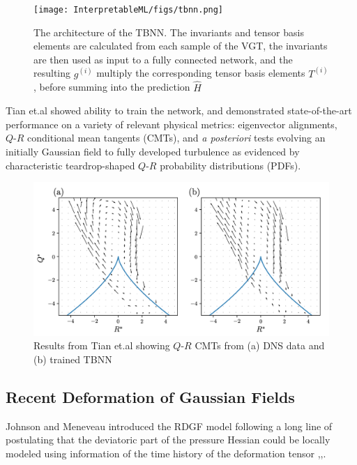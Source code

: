 \begin{figure}
    \centering
    \texttt{[image: InterpretableML/figs/tbnn.png]}
    \caption{The architecture of the TBNN. The invariants and tensor basis elements are calculated from each sample of the VGT, the invariants are then used as input to a fully connected network, and the resulting $g^{(i)}$ multiply the corresponding tensor basis elements $T^{(i)}$, before summing into the prediction $\hat{H}$}
    \label{fig:tbnn_architecture}
\end{figure}

Tian et.al \cite{tian2021} showed ability to train the network, and demonstrated state-of-the-art performance on a variety of relevant physical metrics: eigenvector alignments, $Q\text{-}R$ conditional mean tangents (CMTs), and \textit{a posteriori} tests evolving an initially Gaussian field to fully developed turbulence as evidenced by characteristic teardrop-shaped $Q\text{-}R$ probability distributions (PDFs).

\begin{figure}
    \centering
    \includegraphics[width=0.85\linewidth]{LagrangianDeformationModels/figs/tian_tbnn_qrcmt.png}
    \caption{Results from Tian et.al\cite{tian2021} showing $Q\text{-}R$ CMTs from (a) DNS data and (b) trained TBNN}
    \label{fig:tian_qrcmt}
\end{figure}

\subsection{Recent Deformation of Gaussian Fields}

Johnson and Meneveau \cite{johnson2016} introduced the RDGF model following a long line of postulating that the deviatoric part of the pressure Hessian could be locally modeled using information of the time history of the deformation tensor \cite{chertkov1999},\cite{chevillard2006lagrangian},\cite{chevillard2008modeling}. 

